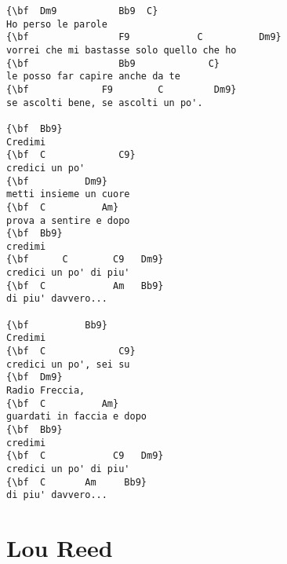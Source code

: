 \documentclass[a4paper]{article}
\begin{document}
\begin{multicols}{2}
\begin{Verbatim}[commandchars=\\\{\}]
{\bf  Dm9           Bb9  C}
Ho perso le parole
{\bf                F9            C          Dm9}
vorrei che mi bastasse solo quello che ho
{\bf                Bb9             C}
le posso far capire anche da te
{\bf             F9        C         Dm9}
se ascolti bene, se ascolti un po'.

{\bf  Bb9}
Credimi
{\bf  C             C9}
credici un po'
{\bf          Dm9}
metti insieme un cuore
{\bf  C          Am}
prova a sentire e dopo
{\bf  Bb9}
credimi
{\bf      C        C9   Dm9}
credici un po' di piu'
{\bf  C            Am   Bb9}
di piu' davvero...

{\bf          Bb9}
Credimi
{\bf  C             C9}
credici un po', sei su
{\bf  Dm9}
Radio Freccia,
{\bf  C          Am}
guardati in faccia e dopo
{\bf  Bb9}
credimi
{\bf  C            C9   Dm9}
credici un po' di piu' 
{\bf  C       Am     Bb9}
di piu' davvero...

\end{Verbatim}
\end{multicols}\newpage
\section{Lou Reed}
\end{document}
